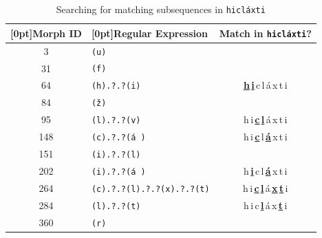 
\begin{table}[t]
\centering
\setlength{\extrarowheight}{8pt}
 \begin{tabular}{clc}
\toprule
\raisebox{0pt}[0pt]{Morph ID} & \raisebox{0pt}[0pt]{Regular Expression} & Match in \texttt{hicl\'{a}xti}? \\
 \midrule
                3 & \texttt{(u)} & \\
                31 &  \texttt{(f)} &  \\
                64 &  \texttt{(h).?.?(i)} & \textbf{\underline{h}\,\underline{i}\,}c\,l\,\'{a}\,x\,t\,i  \\
                84 &  \texttt{(\v{z})} &  \\
                95 &  \texttt{(l).?.?(v)} & h\,i\,\textbf{\underline{c}\,\underline{l}\,}\'{a}\,x\,t\,i \\
                148 &   \texttt{(c).?.?(\'{a}\,)} & h\,i\,\textbf{\underline{c}}\,l\,\textbf{\underline{\'{a}}}\,x\,t\,i \\
                151  &  \texttt{(i).?.?(l)} &  \\
                202 &  \texttt{(i).?.?(\'{a}\,)} & h\,\textbf{\underline{i}}\,c\,l\,\textbf{\underline{\'{a}}}\,x\,t\,i \\
                264 &  \texttt{(c).?.?(l).?.?(x).?.?(t)}  & h\,i\,\textbf{\underline{c}}\,\textbf{\underline{l}}\,\'{a}\,\textbf{\underline{x}}\,\textbf{\underline{t}}\,i \\
                284 &  \texttt{(l).?.?(t)} & h\,i\,c\,\textbf{\underline{l}}\,\'{a}\,x\,\textbf{\underline{t}}\,i  \\
                360 &  \texttt{(r)} & \\
       \bottomrule
 \end{tabular}
 \label{tab:morph-regex}
 \caption{Searching for matching subsequences in \texttt{hicl\'{a}xti}}
 \end{table}
 
